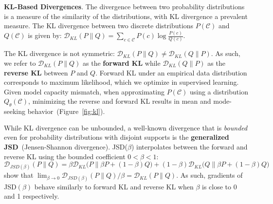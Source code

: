 \documentclass{article} %
\newcommand{\KL}{D_{\mathrm{KL}}}
\def\D{\mathcal{D}}
\def\KL{\mathcal{D}_{KL}}
\newcommand{\mfg}[1]{{\color{purple}[mfg: #1]}}
\begin{document}
\textbf{KL-Based Divergences}. The divergence between two probability distributions is a measure of the similarity of the distributions, with KL divergence a prevalent measure. The KL divergence between two discrete distributions $P(\mathcal{C})$ and $Q(\mathcal{C})$ is given by:
$\KL(P\|Q) = \sum_{c \in \mathcal{C}} P(c) \log \frac{P(c)}{Q(c)}$.

The KL divergence is not symmetric: $\KL(P\|Q) \neq  \KL(Q\|P)$. As such, we refer to $\KL(P\|Q)$ as the \textbf{forward KL} while $\KL(Q\|P)$ as the \textbf{reverse KL} between $P$ and $Q$. Forward KL under an empirical data distribution corresponds to maximum likelihood, which we optimize in supervised learning. Given model capacity mismatch, when approximating $P(\mathcal{C})$ using a distribution $Q_\theta(\mathcal{C})$, minimizing the reverse and forward KL results in mean and mode-seeking behavior~(Figure~\ref{fig:kl}). 





While KL divergence can be unbounded, a well-known divergence that is \emph{bounded} even for probability distributions with disjoint supports %
is the \textbf{generalized JSD}~(Jensen-Shannon divergence).  JSD($\beta$) interpolates between the forward and reverse KL using the bounded coefficient $ 0 < \beta < 1$:
\begin{equation}
\D_{{JSD}(\beta)}(P\|Q) = \beta  \KL\Big(P \Big \| \beta P + (1- \beta)Q \Big) + (1 - \beta) \KL\Big(Q \Big \| \beta P + (1 - \beta) Q\Big) 
\end{equation}
\citet{huszar2015not} show that $ \lim_{\beta\to 0} \D_{{JSD}(\beta)}(P\|Q)/{\beta} = \KL(P\|Q)$.
As such, gradients of JSD$(\beta)$ behave similarly to forward KL and reverse KL when $\beta$ is close to 0 and 1 respectively. %
\end{document}
